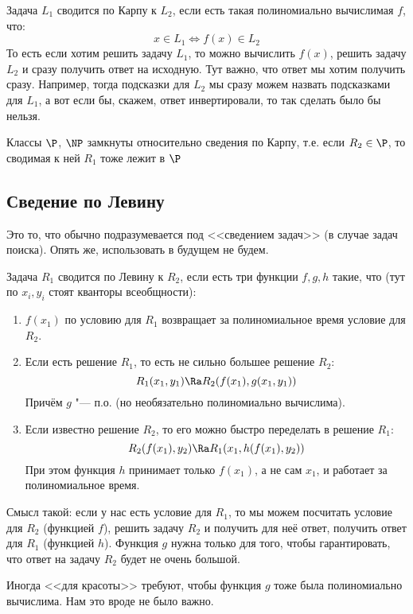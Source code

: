 	Задача $L_1$ сводится по Карпу к $L_2$, если есть такая полиномиально вычислимая $f$, что:
	\[ x \in L_1 \iff f(x) \in L_2 \]
	То есть если хотим решить задачу $L_1$, то можно вычислить $f(x)$, решить задачу $L_2$ и сразу получить ответ на исходную.
	Тут важно, что ответ мы хотим получить сразу.
	Например, тогда подсказки для $L_2$ мы сразу можем назвать подсказками для $L_1$, а вот если бы, скажем, ответ инвертировали, то так сделать было бы нельзя.

	\begin{assertion}
		Классы $\P$, $\NP$ замкнуты относительно сведения по Карпу, т.е. если $R_2 \in \P$, то сводимая к ней $R_1$ тоже лежит в $\P$
	\end{assertion}

\subsection{Сведение по Левину}
	Это то, что обычно подразумевается под <<сведением задач>> (в случае задач поиска).
	Опять же, использовать в будущем не будем.

	Задача $R_1$ сводится по Левину к $R_2$, если есть три функции $f, g, h$ такие, что (тут по $x_i, y_i$ стоят кванторы всеобщности):
	\begin{enumerate}
		\item $f(x_1)$ по условию для $R_1$ возвращает за полиномиальное время условие для $R_2$.
		\item Если есть решение $R_1$, то есть не сильно большее решение $R_2$:
			\[ R_1(x_1, y_1) \Ra R_2(f(x_1), g(x_1, y_1)) \]
			Причём $g$ "--- п.о. (но необязательно полиномиально вычислима).
		\item Если известно решение $R_2$, то его можно быстро переделать в решение $R_1$: 
			\[ R_2(f(x_1), y_2) \Ra R_1(x_1, h(f(x_1), y_2)) \]
			При этом функция $h$ принимает только $f(x_1)$, а не сам $x_1$, и работает за полиномиальное время.
	\end{enumerate}
	\begin{Rem}
		Смысл такой: если у нас есть условие для $R_1$, то мы можем посчитать условие для $R_2$ (функцией $f$), решить задачу $R_2$ и получить для неё ответ,
		получить ответ для $R_1$ (функцией $h$).
		Функция $g$ нужна только для того, чтобы гарантировать, что ответ на задачу $R_2$ будет не очень большой.
	\end{Rem}
	\begin{Rem}
		Иногда <<для красоты>> требуют, чтобы функция $g$ тоже была полиномиально вычислима.
		Нам это вроде не было важно.
	\end{Rem}

